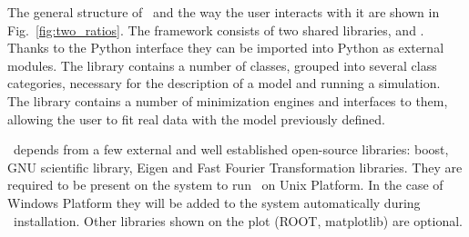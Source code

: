 The general structure of \BornAgain\ and the way the user interacts with it are
shown in Fig.~\ref{fig:two_ratios}.
The framework consists of two shared libraries,  and
. Thanks to the Python interface they can be imported into Python as external modules. The library  contains a number of classes, grouped into several class categories, necessary for the description of a model and running a simulation.
The library   contains a number of minimization engines 
and interfaces to them, allowing the user to fit real data with the model previously defined.

\BornAgain\ depends from a few external and well established open-source libraries: boost, GNU scientific library, Eigen and Fast Fourier Transformation libraries. They are required to be present on the system to run \BornAgain\ on Unix Platform. In the case of Windows Platform they will be added to the system automatically during \BornAgain\ installation. Other libraries shown
on the plot (ROOT, matplotlib) are optional.

 







